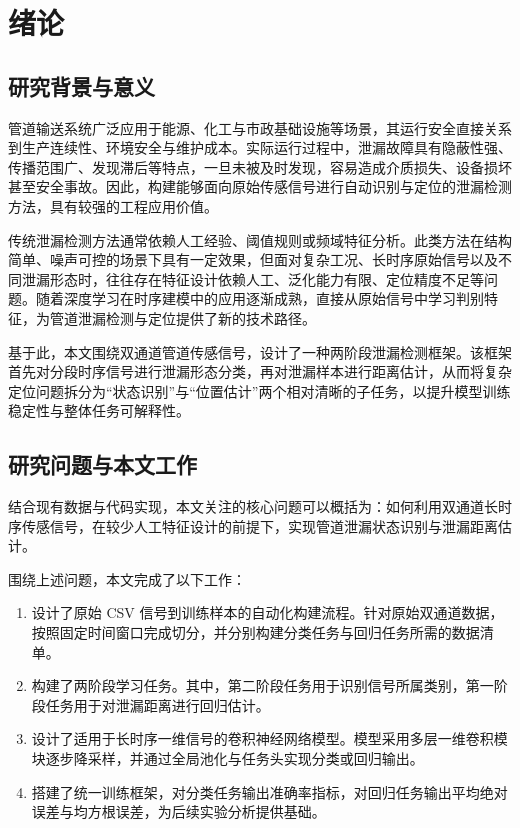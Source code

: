 \chapter{绪论}

\section{研究背景与意义}

管道输送系统广泛应用于能源、化工与市政基础设施等场景，其运行安全直接关系到生产连续性、环境安全与维护成本。实际运行过程中，泄漏故障具有隐蔽性强、传播范围广、发现滞后等特点，一旦未被及时发现，容易造成介质损失、设备损坏甚至安全事故。因此，构建能够面向原始传感信号进行自动识别与定位的泄漏检测方法，具有较强的工程应用价值。

传统泄漏检测方法通常依赖人工经验、阈值规则或频域特征分析。此类方法在结构简单、噪声可控的场景下具有一定效果，但面对复杂工况、长时序原始信号以及不同泄漏形态时，往往存在特征设计依赖人工、泛化能力有限、定位精度不足等问题。随着深度学习在时序建模中的应用逐渐成熟，直接从原始信号中学习判别特征，为管道泄漏检测与定位提供了新的技术路径。

基于此，本文围绕双通道管道传感信号，设计了一种两阶段泄漏检测框架。该框架首先对分段时序信号进行泄漏形态分类，再对泄漏样本进行距离估计，从而将复杂定位问题拆分为“状态识别”与“位置估计”两个相对清晰的子任务，以提升模型训练稳定性与整体任务可解释性。

\section{研究问题与本文工作}

结合现有数据与代码实现，本文关注的核心问题可以概括为：如何利用双通道长时序传感信号，在较少人工特征设计的前提下，实现管道泄漏状态识别与泄漏距离估计。

围绕上述问题，本文完成了以下工作：

\begin{enumerate}
  \item 设计了原始 CSV 信号到训练样本的自动化构建流程。针对原始双通道数据，按照固定时间窗口完成切分，并分别构建分类任务与回归任务所需的数据清单。
  \item 构建了两阶段学习任务。其中，第二阶段任务用于识别信号所属类别，第一阶段任务用于对泄漏距离进行回归估计。
  \item 设计了适用于长时序一维信号的卷积神经网络模型。模型采用多层一维卷积模块逐步降采样，并通过全局池化与任务头实现分类或回归输出。
  \item 搭建了统一训练框架，对分类任务输出准确率指标，对回归任务输出平均绝对误差与均方根误差，为后续实验分析提供基础。
\end{enumerate}

